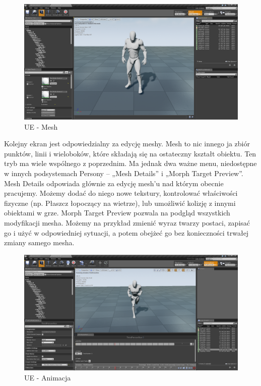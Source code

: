 \documentclass[brudnopis]{xmgr}
\begin{document}
\begin{figure}[!htb]
    \begin{center}
    \includegraphics[scale=0.25]{Screeny/Mesh}
    \end{center}
    \caption{UE - Mesh}
\end{figure}

Kolejny ekran jest odpowiedzialny za edycję meshy. Mesh to nic innego ja zbiór punktów, linii i wieloboków, które składają się na ostateczny kształt obiektu.
Ten tryb ma wiele wspólnego z poprzednim. Ma jednak dwa ważne menu, niedostępne w innych podsystemach Persony – „Mesh Details” i „Morph Target Preview”.
Mesh Details odpowiada głównie za edycję mesh’u nad którym obecnie pracujemy. Możemy dodać do niego nowe tekstury, kontrolować właściwości fizyczne (np. Płaszcz łopoczący na wietrze), lub umożliwić kolizję z innymi obiektami w grze.
Morph Target Preview pozwala na podgląd wszystkich modyfikacji mesha. Możemy na przykład zmienić wyraz twarzy postaci, zapisać go i użyć w odpowiedniej sytuacji, a potem obejżeć go bez konieczności trwałej zmiany samego mesha.

\newpage
\begin{figure}[!htb]
    \begin{center}
    \includegraphics[scale=0.25]{Screeny/Animation}
    \end{center}
    \caption{UE - Animacja}
\end{figure}
\end{document}
